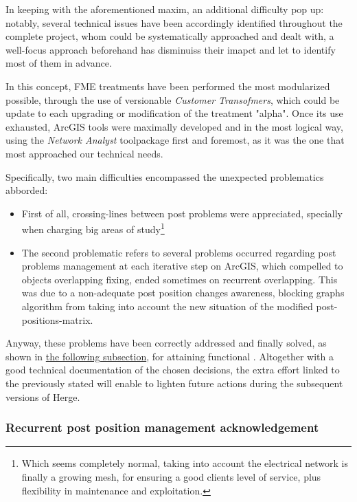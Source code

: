 In keeping with the aforementioned maxim, an additional difficulty pop up: notably, several technical issues have been accordingly identified throughout the complete project, whom could be systematically approached and dealt with, a well-focus approach beforehand has disminuiss their imapct and let to identify most of them in advance.

In this concept, FME treatments have been performed the most modularized possible, through the use of versionable \textit{Customer Transofmers}, which could be update to each upgrading or modification of the treatment "alpha". Once its use exhausted, ArcGIS tools were maximally developed and in the most logical way, using the \textit{Network Analyst} toolpackage first and foremost, as it was the one that most approached our technical needs.

Specifically, two main difficulties encompassed the unexpected problematics abborded: 

\begin{itemize}
    \item First of all, crossing-lines between post problems were appreciated, specially when charging big areas of study\footnote{Which seems completely normal, taking into account the electrical network is finally a growing mesh, for ensuring a good clients level of service, plus flexibility in maintenance and exploitation.} 
    \item The second problematic refers to several problems occurred regarding post problems management at each iterative step on ArcGIS, which compelled to objects overlapping fixing, ended sometimes on recurrent overlapping. This was due to a non-adequate post position changes awareness, blocking graphs algorithm from taking into account the new situation of the modified post-positions-matrix.  
    \end{itemize}

Anyway, these problems have been correctly addressed and finally solved, as shown in \hyperref[susub:AIG:technical-issues:postpositionmanagement]{the following subsection}, for attaining functional . Altogether with a good technical documentation of the chosen decisions, the extra effort linked to the previously stated will enable to lighten future actions during the subsequent versions of Herge.

\subsubsection{Recurrent post position management acknowledgement}
\label{subsub:AIG:technical-issues:postpositionmanagmement}

